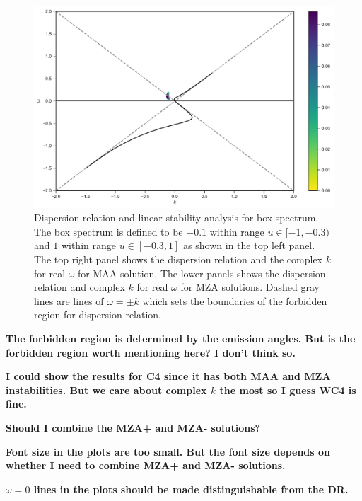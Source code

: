 \documentclass[%
preprint,
 amsmath,amssymb,
 aps,
 prd
]{revtex4-1}
\begin{document}
\begin{figure}
   \endminipage\hfill
   \includegraphics[width=\linewidth]{assets/spectBoxC1MZAmDRPlt.pdf}
   \endminipage\hfill
   \caption{Dispersion relation and linear stability analysis for box spectrum. The box spectrum is defined to be $-0.1$ within range $u\in [-1,-0.3)$ and $1$ within range $u\in [-0.3,1]$ as shown in the top left panel. The top right panel shows the dispersion relation and the complex $k$ for real $\omega$ for MAA solution. The lower panels shows the dispersion relation and complex $k$ for real $\omega$ for MZA solutions. Dashed gray lines are lines of $\omega= \pm k$ which sets the boundaries of the forbidden region for dispersion relation.
    }
   \label{fig-box-c1}
\end{figure}







{\color{red}\bf The forbidden region is determined by the emission angles. But is the forbidden region worth mentioning here? I don't think so.}

{\color{red}\bf I could show the results for C4 since it has both MAA and MZA instabilities. But we care about complex $k$ the most so I guess WC4 is fine.}

{\color{red}\bf Should I combine the MZA+ and MZA- solutions? }

{\color{red}\bf Font size in the plots are too small. But the font size depends on whether I need to combine MZA+ and MZA- solutions. }

{\color{red}\bf $\omega=0$ lines in the plots should be made distinguishable from the DR. }
\end{document}
